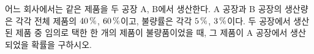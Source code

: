 어느 회사에서는 같은 제품을 두 공장 A, B에서 생산한다. A 공장과 B 공장의 생산량은 각각 전체 제품의 $40\mkern3mu \%$, $60\mkern3mu \%$이고, 불량률은 각각 $5\mkern3mu \%$, $3\mkern3mu \%$이다. 두 공장에서 생산된 제품 중 임의로 택한 한 개의 제품이 불량품이었을 때, 그 제품이 A 공장에서 생산되었을 확률을 구하시오.
